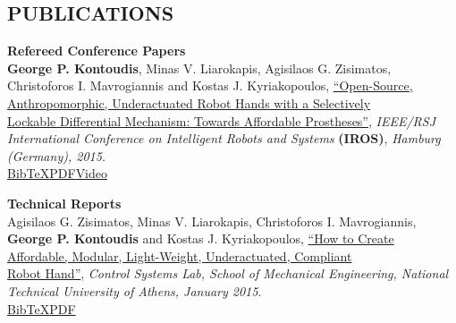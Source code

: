\documentclass[11pt]{res} %
\begin{document}
\begin{resume}
\section{PUBLICATIONS}

\vspace{8pt} %

\small\textbf {Refereed Conference Papers}\\\rbrack \hspace{0.1cm} \small\textbf {George P. Kontoudis}, Minas V. Liarokapis, Agisilaos G. Zisimatos, Christoforos I. Mavrogiannis and Kostas J. Kyriakopoulos, \underline{``Open-Source, Anthropomorphic, Underactuated Robot Hands with a Selectively }\\\underline{Lockable Differential Mechanism: Towards Affordable Prostheses''}, {\it  IEEE/RSJ International Conference on Intelligent Robots and Systems} \small\textbf{(IROS)}, {\it Hamburg (Germany), 2015.}
\\\href{http://www.minasliarokapis.com/Kontoudis2015IROS.bib}
{\lbrack BibTeX\rbrack}\href{http://www.minasliarokapis.com/IROS2015_Kontoudis_AffordableProstheses.pdf}
{\lbrack PDF\rbrack}\href{https://www.youtube.com/watch?v=LoG_JTOIMO4}{\lbrack Video\rbrack}

\small\textbf {Technical Reports}\\\rbrack \hspace{0.1cm} Agisilaos G. Zisimatos, Minas V. Liarokapis, Christoforos I. Mavrogiannis, \small\textbf{George P. Kontoudis} and Kostas J. Kyriakopoulos, \underline{``How to Create Affordable, Modular, Light-Weight, Underactuated, Compliant }\\\underline{Robot Hand''}, {\it Control Systems Lab, School of Mechanical Engineering, National Technical University of Athens, January 2015}.\\\href{http://www.openbionics.org/Zisimatos2015TR.bib}{\lbrack BibTeX\rbrack}\href{http://www.openbionics.org/TR2015_OpenBionics_RobotHandsGuide.pdf}{\lbrack PDF\rbrack}

\vspace{0.2in} %





\end{resume}
\end{document}

